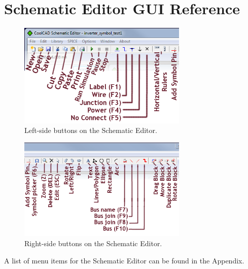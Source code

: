 \section{Schematic Editor GUI Reference}
\label{sec_se_guiref}

\newpage
\begin{figure}[h]
  \centering
    \includegraphics[width=0.72\textwidth]
		{./figures/appendix_buttons_menus_figures/SchematicEditor_LeftButtons.png}
    \caption{Left-side buttons on the Schematic Editor.}
  \label{fig_schematiceditor_leftbuttons_inchapter}
\end{figure} 

\vspace{\parskip}
\begin{figure}[htb]
  \centering
    \includegraphics[width=0.72\textwidth]
		{./figures/appendix_buttons_menus_figures/SchematicEditor_RightButtons.png}
    \caption{Right-side buttons on the Schematic Editor.}
  \label{fig_schematiceditor_rightbuttons_inchapter}
\end{figure} 

A list of menu items for the Schematic Editor can be found in the Appendix.


